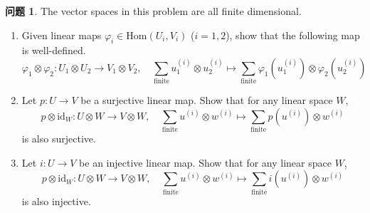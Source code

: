 \documentclass{MainStyle}
\theoremstyle{definition}
\newtheorem{problem}{问题}
\begin{document}
\begin{problem}
The vector spaces in this problem are all finite dimensional.
\begin{enumerate}
    \item Given linear maps $\varphi_i\in \mathrm{Hom}(U_i,V_i)$ ($i=1,2$), show that the following map is well-defined.
          \begin{equation*}
              \varphi_1\otimes \varphi_2:U_1\otimes U_2\to V_1\otimes V_2,\quad \sum_{\text{finite}}u_1^{(i)}\otimes u_2^{(i)}\mapsto \sum_{\text{finite}}\varphi_1(u_1^{(i)})\otimes \varphi_2(u_2^{(i)})
          \end{equation*}
    \item Let $p:U\to V$ be a surjective linear map. Show that for any linear space $W$,
          \begin{equation*}
              p\otimes \mathrm{id}_W:U\otimes W\to V\otimes W,\quad \sum_{\text{finite}}u^{(i)}\otimes w^{(i)}\mapsto \sum_{\text{finite}}p(u^{(i)})\otimes w^{(i)}
          \end{equation*}
          is also surjective.
    \item Let $i:U\to V$ be an injective linear map. Show that for any linear space $W$,
          \begin{equation*}
              p\otimes \mathrm{id}_W:U\otimes W\to V\otimes W,\quad \sum_{\text{finite}}u^{(i)}\otimes w^{(i)}\mapsto \sum_{\text{finite}}i(u^{(i)})\otimes w^{(i)}
          \end{equation*}
          is also injective.
\end{enumerate}
\end{problem}
\end{document}
